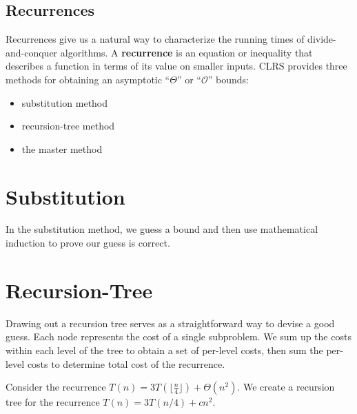 \documentclass[]{book}
\newlength{\mylen}
\begin{document}
      \subsection*{Recurrences}
        Recurrences give us a natural way to characterize the running times of divide-and-conquer algorithms.
        A \textbf{recurrence} is an equation or inequality that describes a function in terms of its value
        on smaller inputs.
        CLRS provides three methods for obtaining an asymptotic ``$\Theta$'' or ``$\mathcal{O}$'' bounds:
        \renewcommand\labelitemi{\raisebox{\mylen}{\tiny$\bullet$}}
        \begin{itemize}
          \item substitution method
          \item recursion-tree method
          \item the master method
        \end{itemize}
      \section{Substitution}
        In the substitution method, we guess a bound and then use mathematical
        induction to prove our guess is correct.

      \section{Recursion-Tree}
        Drawing out a recursion tree serves as a straightforward way to devise
        a good guess. Each node represents the cost of a single subproblem. We
        sum up the costs within each level of the tree to obtain a set of per-level
        costs, then sum the per-level costs to determine total cost of the recurrence.

        Consider the recurrence $T(n) = 3T(\lfloor \frac{n}{4} \rfloor) + \Theta(n^2)$.
        We create a recursion tree for the recurrence $T(n) = 3T(n/4) + cn^2$.
\end{document}
